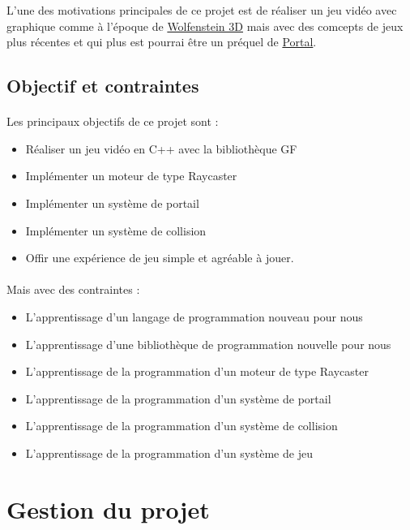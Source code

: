 \documentclass[12pt]{report}
\begin{document}
L'une des motivations principales de ce projet est de réaliser un jeu vidéo
avec graphique comme à l'époque de \href{https://fr.wikipedia.org/wiki/Wolfenstein_3D}{Wolfenstein 3D} 
mais avec des comcepts de jeux plus récentes et qui plus est pourrai être
un préquel de \href{https://fr.wikipedia.org/wiki/Portal_(jeu_vid%C3%A9o)}{Portal}.


\subsection{Objectif et contraintes}

\paragraph{}
Les principaux objectifs de ce projet sont :
\begin{itemize}
	\item Réaliser un jeu vidéo en C++ avec la bibliothèque GF
	\item Implémenter un moteur de type Raycaster
	\item Implémenter un système de portail
	\item Implémenter un système de collision
	\item Offir une expérience de jeu simple et agréable à jouer.
\end{itemize}

\paragraph{}
Mais avec des contraintes :
\begin{itemize}
	\item L'apprentissage d'un langage de programmation nouveau pour nous
	\item L'apprentissage d'une bibliothèque de programmation nouvelle pour nous
	\item L'apprentissage de la programmation d'un moteur de type Raycaster
	\item L'apprentissage de la programmation d'un système de portail
	\item L'apprentissage de la programmation d'un système de collision
	\item L'apprentissage de la programmation d'un système de jeu
\end{itemize}

\section{Gestion du projet}
\end{document}
